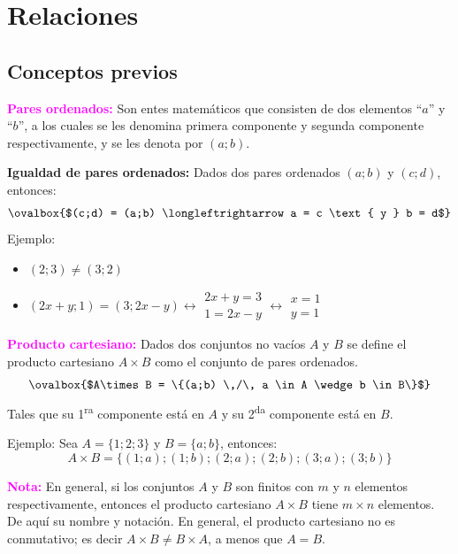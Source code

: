 \documentclass[11pt,a4paper]{article}
\begin{document}
\newpage
\section{Relaciones}

\subsection*{Conceptos previos}

\textcolor{magenta}{\textbf{Pares ordenados:}} Son entes matemáticos que consisten de dos
elementos ``$a$'' y ``$b$'', a los cuales se les denomina primera componente y segunda
componente respectivamente, y se les denota por $(a;b)$.

\textbf{Igualdad de pares ordenados:} Dados dos pares ordenados $(a;b)$ y $(c;d)$, entonces:
\[\ovalbox{$(c;d) = (a;b) \longleftrightarrow a = c \text{ y } b = d$}\]
Ejemplo:
\begin{itemize}
  \item $(2;3) \neq (3;2)$
  \item $(2x + y; 1) = (3; 2x - y) \longleftrightarrow
  \begin{array}{l} 2x + y = 3\\ 1 = 2x - y\end{array}
  \longleftrightarrow
  \begin{array}{l} x = 1\\ y = 1\end{array}$
\end{itemize}

\textcolor{magenta}{\textbf{Producto cartesiano:}} Dados dos conjuntos no vacíos $A$ y $B$ se
define el producto cartesiano $A\times B$ como el conjunto de pares ordenados.
\[\ovalbox{$A\times B = \{(a;b) \,/\, a \in A \wedge b \in B\}$}\]
Tales que su 1\textsuperscript{ra} componente está en $A$ y su 2\textsuperscript{da} componente
está en $B$.

Ejemplo: \quad Sea $A = \{1; 2; 3\}$ y $B = \{a; b\}$, entonces:
\[A\times B = \{(1;a); (1;b); (2;a); (2;b); (3;a); (3;b)\}\]

\textcolor{magenta}{\textbf{Nota:}} En general, si los conjuntos $A$ y $B$ son finitos con
$m$ y $n$ elementos respectivamente, entonces el producto cartesiano $A\times B$ tiene
$m\times n$ elementos. De aquí su nombre y notación. En general, el producto cartesiano no
es conmutativo; es decir $A\times B \neq B\times A$, a menos que $A = B$.
\end{document}
